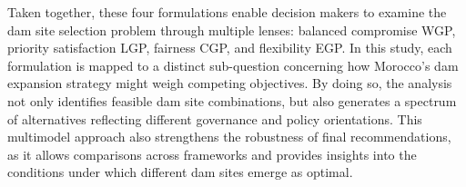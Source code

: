 Taken together, these four formulations enable decision makers to examine the dam site selection problem through multiple lenses: balanced compromise \gls{WGP}, priority satisfaction \gls{LGP}, fairness \gls{CGP}, and flexibility \gls{EGP}. In this study, each formulation is mapped to a distinct sub-question concerning how Morocco's dam expansion strategy might weigh competing objectives. By doing so, the analysis not only identifies feasible dam site combinations, but also generates a spectrum of alternatives reflecting different governance and policy orientations. This multimodel approach also strengthens the robustness of final recommendations, as it allows comparisons across frameworks and provides insights into the conditions under which different dam sites emerge as optimal.

